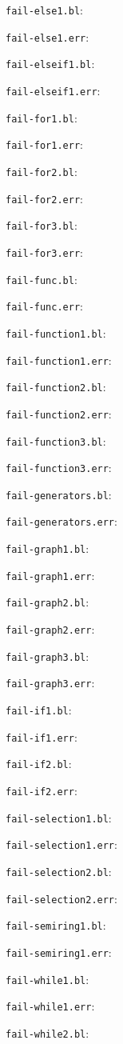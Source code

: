 \verb=fail-else1.bl=:

\verb=fail-else1.err=:

\verb=fail-elseif1.bl=:

\verb=fail-elseif1.err=:

\verb=fail-for1.bl=:

\verb=fail-for1.err=:

\verb=fail-for2.bl=:

\verb=fail-for2.err=:

\verb=fail-for3.bl=:

\verb=fail-for3.err=:

\verb=fail-func.bl=:

\verb=fail-func.err=:

\verb=fail-function1.bl=:

\verb=fail-function1.err=:

\verb=fail-function2.bl=:

\verb=fail-function2.err=:

\verb=fail-function3.bl=:

\verb=fail-function3.err=:

\verb=fail-generators.bl=:

\verb=fail-generators.err=:

\verb=fail-graph1.bl=:

\verb=fail-graph1.err=:

\verb=fail-graph2.bl=:

\verb=fail-graph2.err=:

\verb=fail-graph3.bl=:

\verb=fail-graph3.err=:

\verb=fail-if1.bl=:

\verb=fail-if1.err=:

\verb=fail-if2.bl=:

\verb=fail-if2.err=:

\verb=fail-selection1.bl=:

\verb=fail-selection1.err=:

\verb=fail-selection2.bl=:

\verb=fail-selection2.err=:

\verb=fail-semiring1.bl=:

\verb=fail-semiring1.err=:

\verb=fail-while1.bl=:

\verb=fail-while1.err=:

\verb=fail-while2.bl=:

